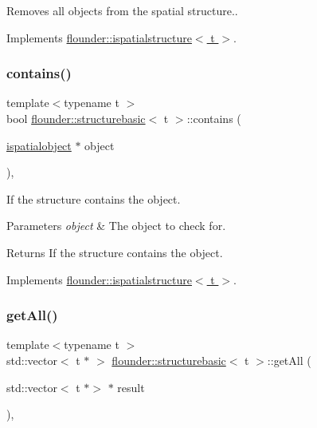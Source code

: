 Removes all objects from the spatial structure.. 



Implements \hyperlink{classflounder_1_1ispatialstructure_a422fac0231ea3095e2f85951259a4686}{flounder\+::ispatialstructure$<$ t $>$}.

\mbox{\label{classflounder_1_1structurebasic_ac9a9bcd40d564056c33c2ade540f4e4c}} 
\subsubsection{\texorpdfstring{contains()}{contains()}}
{\footnotesize\ttfamily template$<$typename t $>$ \\
bool \hyperlink{classflounder_1_1structurebasic}{flounder\+::structurebasic}$<$ t $>$\+::contains (\begin{DoxyParamCaption}\item[{\hyperlink{classflounder_1_1ispatialobject}{ispatialobject} $\ast$}]{object }\end{DoxyParamCaption})\hspace{0.3cm}{\ttfamily [override]}, {\ttfamily [virtual]}}



If the structure contains the object. 


\begin{DoxyParams}{Parameters}
{\em object} & The object to check for. \\
\hline
\end{DoxyParams}
\begin{DoxyReturn}{Returns}
If the structure contains the object. 
\end{DoxyReturn}


Implements \hyperlink{classflounder_1_1ispatialstructure_a80e36c5dca0995c27d7222e3c3fc1b90}{flounder\+::ispatialstructure$<$ t $>$}.

\mbox{\label{classflounder_1_1structurebasic_a6e3292d86b68b829540f011593dec6eb}} 
\subsubsection{\texorpdfstring{get\+All()}{getAll()}}
{\footnotesize\ttfamily template$<$typename t $>$ \\
std\+::vector$<$ t $\ast$ $>$ \hyperlink{classflounder_1_1structurebasic}{flounder\+::structurebasic}$<$ t $>$\+::get\+All (\begin{DoxyParamCaption}\item[{std\+::vector$<$ t $\ast$$>$ $\ast$}]{result }\end{DoxyParamCaption})\hspace{0.3cm}{\ttfamily [override]}, {\ttfamily [virtual]}}



